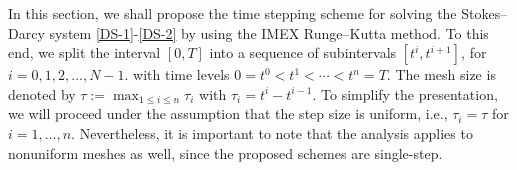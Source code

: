 \documentclass[a4paper, oneside]{book}
\begin{document}



In this section, we shall propose the time stepping scheme for solving the
Stokes--Darcy system \eqref{DS-1}-\eqref{DS-2} by using the IMEX Runge--Kutta method.
To this end, we split the interval $[0,T]$ into a sequence of subintervals $[t^i, t^{i+1}]$, for $i=0,1,2,\ldots,N-1$.
with time levels $0 = t^0 < t^1 < \cdots < t^n = T$. 
The mesh size is denoted by $\tau := \max_{1\leq i \leq n}\tau_i$ with $\tau_i = t^i - t^{i-1}$.
To simplify the presentation, we will proceed under the assumption that the step size is uniform, i.e., $\tau_i = \tau$ for $i = 1, \dots, n$.
Nevertheless, it is important to note that the analysis applies to nonuniform meshes as well, since the proposed schemes are single-step.



\end{document}
